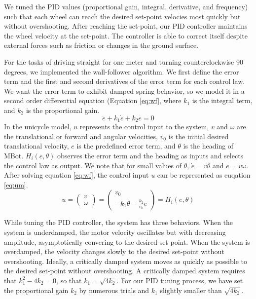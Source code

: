 \documentclass[conference]{IEEEtran}
\begin{document}
We tuned the PID values (proportional gain, integral, derivative, and frequency) such that each wheel can reach the desired set-point velocies most quickly but without overshooting. After reaching the set-point, our PID controller maintains the wheel velocity at the set-point. The controller is able to correct itself despite external forces such as friction or changes in the ground surface.

For the tasks of driving straight for one meter and turning counterclockwise 90 degrees, we implemented the wall-follower algorithm. We first define the error term and the first and second derivatives of the error term for each control law. We want the error term to exhibit damped spring behavior, so we model it in a second order differential equation (Equation \ref{eq:wf}, where $k_1$ is the integral term, and $k_2$ is the proportional gain.
\begin{equation} \label{eq:wf}
\ddot{e} + k_1 \dot{e} + k_2 e = 0
\end{equation} 
In the unicycle model, $u$ represents the control input to the system, $v$ and $\omega$ are the translational or forward and angular velocities, $v_0$ is the initial desired translational velocity, $e$ is the predefined error term, and $\theta$ is the heading of MBot. $H_i(e,\theta)$ observes the error term and the heading as inputs and selects the control law as output.
We note that for small values of $\theta$, $\dot{e} = v\theta$ and $\ddot{e} = v\omega$.
After solving equation \ref{eq:wf}, the control input $u$ can be represented as euqation \ref{eq:um}.
\begin{equation} \label{eq:um}
u = \left(\begin{array}{c} v \\ \omega \end{array}\right) = \left(\begin{array}{c} v_0 \\ -k_1\theta-\frac{k_2}{v_0}e \end{array}\right) = H_i(e,\theta) 
\end{equation}

While tuning the PID controller, the system has three behaviors. When the system is underdamped, the motor velocity oscillates but with decreasing amplitude, asymptotically convering to the desired set-point. When the system is overdamped, the velocity changes slowly to the desired set-point without overshooting. Ideally, a critically damped system moves as quickly as possible to the desired set-point without overshooting. A critically damped system requires that $k_1^2 - 4k_2 = 0$, so that $k_1 = \sqrt{4k_2}$. For our PID tuning process, we have set the proportional gain $k_2$ by numerous trials and $k_1$ slightly smaller than $\sqrt{4k_2}$.
\end{document}
